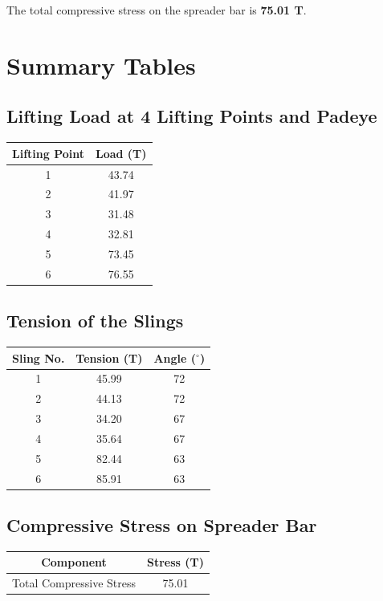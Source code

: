 \documentclass[12pt]{article}
\begin{document}
The total compressive stress on the spreader bar is \textbf{75.01 T}.

\section{Summary Tables}
\subsection*{Lifting Load at 4 Lifting Points and Padeye}
\begin{center}
\begin{tabular}{|c|c|}
\hline
Lifting Point & Load (T) \\
\hline
1 & 43.74 \\
2 & 41.97 \\
3 & 31.48 \\
4 & 32.81 \\
5 & 73.45 \\
6 & 76.55 \\
\hline
\end{tabular}
\end{center}

\subsection*{Tension of the Slings}
\begin{center}
\begin{tabular}{|c|c|c|}
\hline
Sling No. & Tension (T) & Angle ($^\circ$) \\
\hline
1 & 45.99 & 72 \\
2 & 44.13 & 72 \\
3 & 34.20 & 67 \\
4 & 35.64 & 67 \\
5 & 82.44 & 63 \\
6 & 85.91 & 63 \\
\hline
\end{tabular}
\end{center}

\subsection*{Compressive Stress on Spreader Bar}
\begin{center}
\begin{tabular}{|c|c|}
\hline
Component & Stress (T) \\
\hline
Total Compressive Stress & 75.01 \\
\hline
\end{tabular}
\end{center}
\end{document}
